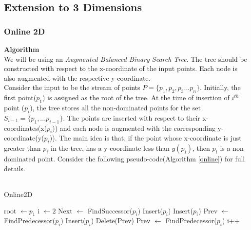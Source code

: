 \documentclass{article}
\begin{document}
\subsection{Extension to 3 Dimensions}
\subsubsection{Online 2D}
\textbf{Algorithm} \\
We will be using an \emph{Augmented Balanced Binary Search Tree}. The tree should be constructed with respect to the x-coordinate of the input points. Each node is also augmented with the respective y-coordinate. \\

Consider the input to be the stream of points $P = \{p_1,p_2,p_3 ... p_n\}$. Initially, the first point($p_1$) is assigned as the root of the tree. At the time of insertion of \emph{$i^{th}$} point ($p_i$), the tree stores all the non-dominated points for the set $S_{i-1} = \{p_1,...p_{i-1} \}$. The points are inserted with respect to their x-coordinates(x($p_i$)) and each node is augmented with the corresponding y-coordinate(y($p_i$)). The main idea is that, if the point whose x-coordinate is just greater than $p_i$ in the tree, has a y-coordinate less than $y(p_i)$, then $p_i$ is a non-dominated point. Consider the following pseudo-code(Algorithm \ref{online}) for full details.\\ \\
\begin{algorithm}
\caption{Online2D}
\label{online}
\begin{algorithmic}[1]
\State root $\gets p_1$  
\State i $\gets 2$
\State Next $\gets$ FindSuccessor($p_i$) 
\State Insert($p_i$)
  
\State Insert($p_i$) 
\State Prev $\gets$ FindPredecessor($p_i$)  
\State Insert($p_i$)
\Else
{}   
\State Delete(Prev)   
\State Prev $\gets$ FindPredecessor($p_i$)
\EndWhile
\EndIf
\EndIf
\State i++
\EndWhile
\EndProcedure
\end{algorithmic}
\end{algorithm}
\end{document}
